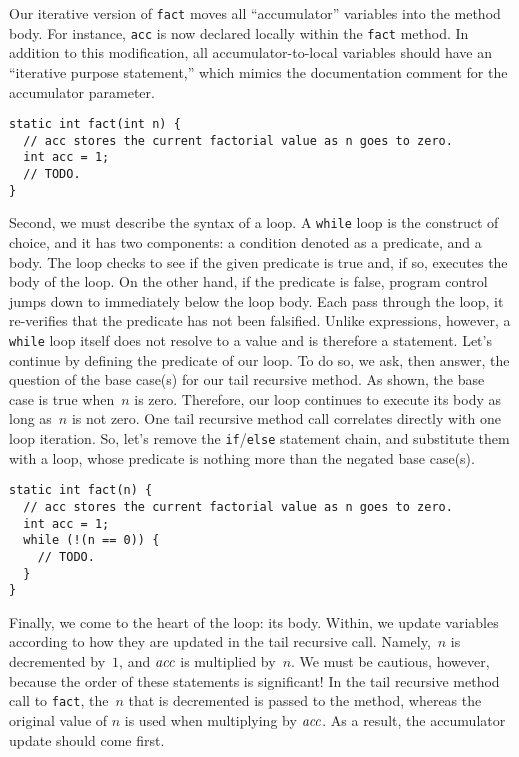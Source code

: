 Our iterative version of \texttt{fact} moves all ``accumulator'' variables into the method body. 
For instance, \texttt{acc} is now declared locally within the \texttt{fact} method. 
In addition to this modification, all accumulator-to-local variables should have an ``iterative purpose statement,'' which mimics the documentation comment for the accumulator parameter.

\begin{lstlisting}[language=MyJava]
static int fact(int n) {
  // acc stores the current factorial value as n goes to zero.
  int acc = 1;
  // TODO.
}
\end{lstlisting}

Second, we must describe the syntax of a loop. 
A \texttt{while} loop is the construct of choice, and it has two components: a condition denoted as a predicate, and a body. 
The loop checks to see if the given predicate is true and, if so, executes the body of the loop. 
On the other hand, if the predicate is false, program control jumps down to immediately below the loop body. 
Each pass through the loop, it re-verifies that the predicate has not been falsified. 
Unlike expressions, however, a \texttt{while} loop itself does not resolve to a value and is therefore a statement. 
Let's continue by defining the predicate of our loop. 
To do so, we ask, then answer, the question of the base case(s) for our tail recursive method. 
As shown, the base case is true when~$n$ is zero. 
Therefore, our loop continues to execute its body as long as~$n$ is not zero. 
One tail recursive method call correlates directly with one loop iteration. 
So, let's remove the \texttt{if}/\texttt{else} statement chain, and substitute them with a loop, whose predicate is nothing more than the negated base case(s).

\begin{lstlisting}[language=MyJava]
static int fact(n) {
  // acc stores the current factorial value as n goes to zero.
  int acc = 1;
  while (!(n == 0)) {
    // TODO.
  }
}
\end{lstlisting}

Finally, we come to the heart of the loop: its body.
Within, we update variables according to how they are updated in the tail recursive call. 
Namely,~$n$ is decremented by~$1$, and $\emph{acc}$ is multiplied by~$n$. 
We must be cautious, however, because the order of these statements is significant! 
In the tail recursive method call to \texttt{fact}, the~$n$ that is decremented is passed to the method, whereas the original value of $n$ is used when multiplying by $\emph{acc}$. As a result, the accumulator update should come first.

